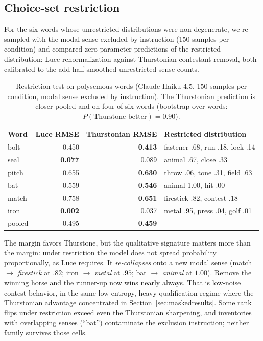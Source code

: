 \documentclass[11pt]{article}
\begin{document}
\subsection{Choice-set restriction}

For the six words whose unrestricted distributions were non-degenerate,
we re-sampled with the modal sense excluded by instruction (150 samples
per condition) and compared zero-parameter predictions of the restricted
distribution: Luce renormalization against Thurstonian contestant
removal, both calibrated to the add-half smoothed unrestricted sense
counts.

\begin{table}[ht]
\centering
\begin{tabular}{lrrl}
\toprule
Word & Luce RMSE & Thurstonian RMSE & Restricted distribution \\
\midrule
bolt  & 0.450 & \textbf{0.413} & fastener .68, run .18, lock .14 \\
seal  & \textbf{0.077} & 0.089 & animal .67, close .33 \\
pitch & 0.655 & \textbf{0.630} & throw .06, tone .31, field .63 \\
bat   & 0.559 & \textbf{0.546} & animal 1.00, hit .00 \\
match & 0.758 & \textbf{0.651} & firestick .82, contest .18 \\
iron  & \textbf{0.002} & 0.037 & metal .95, press .04, golf .01 \\
\midrule
pooled & 0.495 & \textbf{0.459} & \\
\bottomrule
\end{tabular}
\caption{Restriction test on polysemous words (Claude Haiku 4.5, 150
samples per condition, modal sense excluded by instruction). The
Thurstonian prediction is closer pooled and on four of six words
(bootstrap over words: $P(\text{Thurstone better}) = 0.90$).}
\label{tab:restrict}
\end{table}

The margin favors Thurstone, but the qualitative signature matters more
than the margin: under restriction the model does not spread probability
proportionally, as Luce requires. It \emph{re-collapses} onto a new modal
sense (match $\to$ \emph{firestick} at $.82$; iron $\to$ \emph{metal} at
$.95$; bat $\to$ \emph{animal} at $1.00$). Remove the winning horse and
the runner-up now wins nearly always. That is low-noise contest behavior,
in the same low-entropy, heavy-qualification regime where the Thurstonian
advantage concentrated in Section~\ref{sec:maskedresults}. Some rank
flips under restriction exceed even the Thurstonian sharpening, and
inventories with overlapping senses (``bat'') contaminate the exclusion
instruction; neither family survives those cells.
\end{document}
